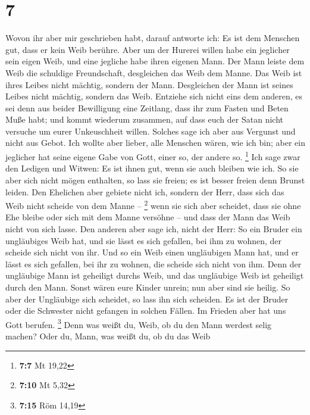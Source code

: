 \hypertarget{section-6}{%
\section{7}\label{section-6}}

 Wovon ihr aber mir geschrieben habt, darauf antworte ich:
Es ist dem Menschen gut, dass er kein Weib berühre.  Aber
um der Hurerei willen habe ein jeglicher sein eigen Weib, und eine
jegliche habe ihren eigenen Mann.  Der Mann leiste dem
Weib die schuldige Freundschaft, desgleichen das Weib dem Manne.
 Das Weib ist ihres Leibes nicht mächtig, sondern der
Mann. Desgleichen der Mann ist seines Leibes nicht mächtig, sondern das
Weib.  Entziehe sich nicht eins dem anderen, es sei denn
aus beider Bewilligung eine Zeitlang, dass ihr zum Fasten und Beten Muße
habt; und kommt wiederum zusammen, auf dass euch der Satan nicht
versuche um eurer Unkeuschheit willen.  Solches sage ich
aber aus Vergunst und nicht aus Gebot.  Ich wollte aber
lieber, alle Menschen wären, wie ich bin; aber ein jeglicher hat seine
eigene Gabe von Gott, einer so, der andere so. \footnote{\textbf{7:7} Mt
  19,22}  Ich sage zwar den Ledigen und Witwen: Es ist
ihnen gut, wenn sie auch bleiben wie ich.  So sie aber
sich nicht mögen enthalten, so lass sie freien; es ist besser freien
denn Brunst leiden.  Den Ehelichen aber gebiete nicht
ich, sondern der Herr, dass sich das Weib nicht scheide von dem Manne --
\footnote{\textbf{7:10} Mt 5,32}  wenn sie sich aber
scheidet, dass sie ohne Ehe bleibe oder sich mit dem Manne versöhne --
und dass der Mann das Weib nicht von sich lasse.  Den
anderen aber sage ich, nicht der Herr: So ein Bruder ein ungläubiges
Weib hat, und sie lässt es sich gefallen, bei ihm zu wohnen, der scheide
sich nicht von ihr.  Und so ein Weib einen ungläubigen
Mann hat, und er lässt es sich gefallen, bei ihr zu wohnen, die scheide
sich nicht von ihm.  Denn der ungläubige Mann ist
geheiligt durchs Weib, und das ungläubige Weib ist geheiligt durch den
Mann. Sonst wären eure Kinder unrein; nun aber sind sie heilig.
 So aber der Ungläubige sich scheidet, so lass ihn sich
scheiden. Es ist der Bruder oder die Schwester nicht gefangen in solchen
Fällen. Im Frieden aber hat uns Gott berufen. \footnote{\textbf{7:15}
  Röm 14,19}  Denn was weißt du, Weib, ob du den Mann
werdest selig machen? Oder du, Mann, was weißt du, ob du das Weib
